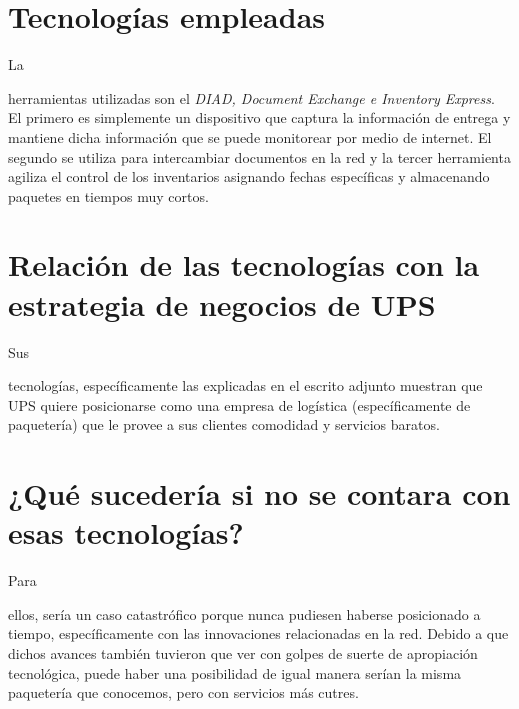 \documentclass[stu, 12pt, letterpaper, donotrepeattitle, floatsintext, natbib]{apa7}
\begin{document}
\section{Tecnologías empleadas}
La \begin{justifying}
    herramientas utilizadas son el \emph{DIAD, Document Exchange e Inventory Express}. El primero es simplemente un dispositivo que
    captura la información de entrega y mantiene dicha información que se puede monitorear por medio de internet.
    El segundo se utiliza para intercambiar documentos en la red y la tercer herramienta agiliza el control de los inventarios 
    asignando fechas específicas y almacenando paquetes en tiempos muy cortos.\par
\end{justifying}
\vspace{\baselineskip}
\section{Relación de las tecnologías con la estrategia de negocios de UPS}
Sus \begin{justifying}
    tecnologías, específicamente las explicadas en el escrito adjunto muestran que UPS quiere posicionarse
    como una empresa de logística (específicamente de paquetería) que le provee a sus clientes comodidad y servicios baratos.\par
\end{justifying}
\vspace{\baselineskip}
\section{¿Qué sucedería si no se contara con esas tecnologías?}
Para \begin{justifying}
    ellos, sería un caso catastrófico porque nunca pudiesen haberse posicionado a tiempo,
    específicamente con las innovaciones relacionadas en la red. Debido a que dichos avances también tuvieron
    que ver con golpes de suerte de apropiación tecnológica, puede haber una posibilidad de igual manera serían la misma
    paquetería que conocemos, pero con servicios más cutres.\par
\end{justifying}
\end{document}
